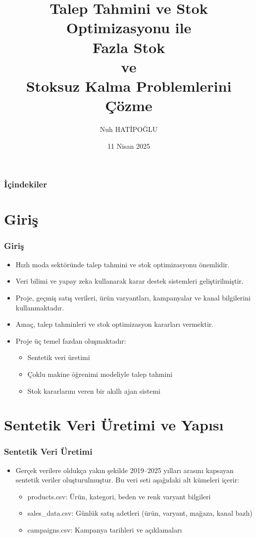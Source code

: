 \documentclass[12pt]{beamer}
\title{Talep Tahmini ve Stok Optimizasyonu ile \\ Fazla Stok \\ ve \\ Stoksuz Kalma Problemlerini Çözme}
\author{Nuh HATİPOĞLU}
\date{11 Nisan 2025}
\begin{document}
\begin{frame}
  \titlepage
\end{frame}

\begin{frame}
  \frametitle{İçindekiler}
  \tableofcontents
\end{frame}

\section{Giriş}
\begin{frame}
  \frametitle{Giriş}
  \begin{itemize}
    \item Hızlı moda sektöründe talep tahmini ve stok optimizasyonu önemlidir.
    \item Veri bilimi ve yapay zeka kullanarak karar destek sistemleri geliştirilmiştir.
    \item Proje, geçmiş satış verileri, ürün varyantları, kampanyalar ve kanal bilgilerini kullanmaktadır.  
    \item Amaç, talep tahminleri ve stok optimizasyon kararları vermektir.
    \item Proje üç temel fazdan oluşmaktadır:
      \begin{itemize}
        \item Sentetik veri üretimi
        \item Çoklu makine öğrenimi modeliyle talep tahmini
        \item Stok kararlarını veren bir akıllı ajan sistemi
      \end{itemize}
    \end{itemize} %
\end{frame}

\section{Sentetik Veri Üretimi ve Yapısı}
\begin{frame}
  \frametitle{Sentetik Veri Üretimi}
  \begin{itemize}
  	\item Gerçek verilere oldukça yakın şekilde 2019–2025 yılları arasını kapsayan sentetik veriler oluşturulmuştur. Bu veri seti aşağıdaki alt kümeleri içerir:
  	\begin{itemize}
  		\item products.csv: Ürün, kategori, beden ve renk varyant bilgileri
  		\item sales\_data.csv: Günlük satış adetleri (ürün, varyant, mağaza, kanal bazlı)
  		\item campaigns.csv: Kampanya tarihleri ve açıklamaları
  	\end{itemize}  

  \end{itemize}  
\end{frame}
\end{document}
